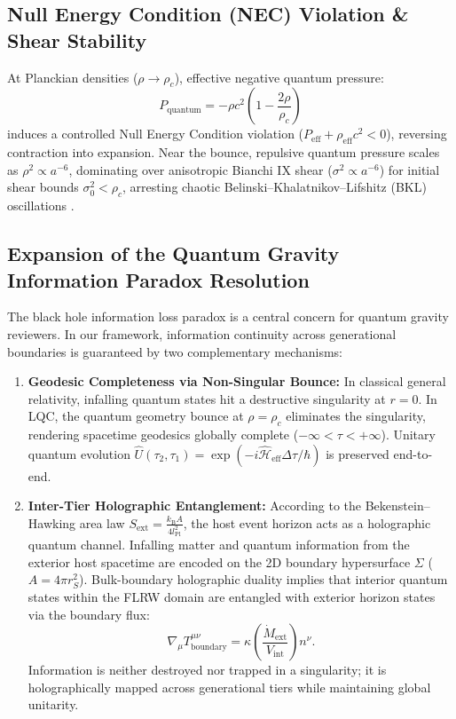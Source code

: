 \documentclass[11pt,a4paper]{article}
\theoremstyle{definition}
\begin{document}
\subsection{Null Energy Condition (NEC) Violation \& Shear Stability}\label{sec:nec_shear}
At Planckian densities ($\rho \to \rho_c$), effective negative quantum pressure:
\begin{equation}\label{eq:quantum_pressure}
    P_{\text{quantum}} = -\rho c^2 \left(1 - \frac{2\rho}{\rho_c}\right)
\end{equation}
induces a controlled Null Energy Condition violation ($P_{\text{eff}} + \rho_{\text{eff}} c^2 < 0$), reversing contraction into expansion. Near the bounce, repulsive quantum pressure scales as $\rho^2 \propto a^{-6}$, dominating over anisotropic Bianchi IX shear ($\sigma^2 \propto a^{-6}$) for initial shear bounds $\sigma_0^2 < \rho_c$, arresting chaotic Belinski--Khalatnikov--Lifshitz (BKL) oscillations \cite{corichi2012}.

\subsection{Expansion of the Quantum Gravity Information Paradox Resolution}\label{sec:info_paradox}
The black hole information loss paradox is a central concern for quantum gravity reviewers. In our framework, information continuity across generational boundaries is guaranteed by two complementary mechanisms:
\begin{enumerate}
    \item \textbf{Geodesic Completeness via Non-Singular Bounce:} In classical general relativity, infalling quantum states hit a destructive singularity at $r=0$. In LQC, the quantum geometry bounce at $\rho = \rho_c$ eliminates the singularity, rendering spacetime geodesics globally complete ($-\infty < \tau < +\infty$). Unitary quantum evolution $\hat{U}(\tau_2, \tau_1) = \exp(-i \hat{\mathcal{H}}_{\text{eff}} \Delta\tau/\hbar)$ is preserved end-to-end.
    \item \textbf{Inter-Tier Holographic Entanglement:} According to the Bekenstein--Hawking area law $S_{\text{ext}} = \frac{k_{\text{B}} A}{4 l_{\text{Pl}}^2}$, the host event horizon acts as a holographic quantum channel. Infalling matter and quantum information from the exterior host spacetime are encoded on the 2D boundary hypersurface $\Sigma$ ($A = 4\pi r_S^2$). Bulk-boundary holographic duality implies that interior quantum states within the FLRW domain are entangled with exterior horizon states via the boundary flux:
    \begin{equation}\label{eq:holo_flux}
        \nabla_\mu T_{\text{boundary}}^{\mu\nu} = \kappa \left( \frac{\dot{M}_{\text{ext}}}{V_{\text{int}}} \right) n^\nu.
    \end{equation}
    Information is neither destroyed nor trapped in a singularity; it is holographically mapped across generational tiers while maintaining global unitarity.
\end{enumerate}
\end{document}
